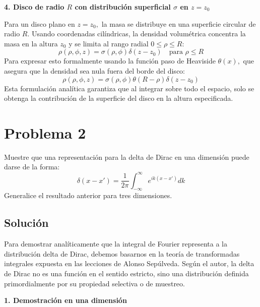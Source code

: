 \documentclass[a4paper]{article}
\begin{document}
\textbf{4. Disco de radio $R$ con distribución superficial $\sigma$ en $z = z_0$}

Para un disco plano en $z = z_0,$ la masa se distribuye en una superficie circular de radio $R.$ Usando coordenadas cilíndricas, la densidad volumétrica concentra la masa en la altura $z_0$ y se limita al rango radial $0 \le \rho \le R$:
$$ \rho(\rho, \phi, z) = \sigma(\rho, \phi) \delta(z - z_0) \quad \text{para } \rho \le R $$
Para expresar esto formalmente usando la función paso de Heaviside $\theta(x),$ que asegura que la densidad sea nula fuera del borde del disco:
$$ \rho(\rho, \phi, z) = \sigma(\rho, \phi) \theta(R - \rho) \delta(z - z_0) $$
Esta formulación analítica garantiza que al integrar sobre todo el espacio, solo se obtenga la contribución de la superficie del disco en la altura especificada.



\section{Problema 2}
Muestre que una representación para la delta de Dirac en una dimensión puede darse de la forma:
$$ \delta(x - x') = \frac{1}{2\pi} \int_{-\infty}^{\infty} e^{ik(x-x')} dk $$
Generalice el resultado anterior para tres dimensiones.

\subsection{Solución}

Para demostrar analíticamente que la integral de Fourier representa a la distribución delta de Dirac, debemos basarnos en la teoría de transformadas integrales expuesta en las lecciones de Alonso Sepúlveda. Según el autor, la delta de Dirac no es una función en el sentido estricto, sino una distribución definida primordialmente por su propiedad selectiva o de muestreo.

\textbf{1. Demostración en una dimensión}
\end{document}
